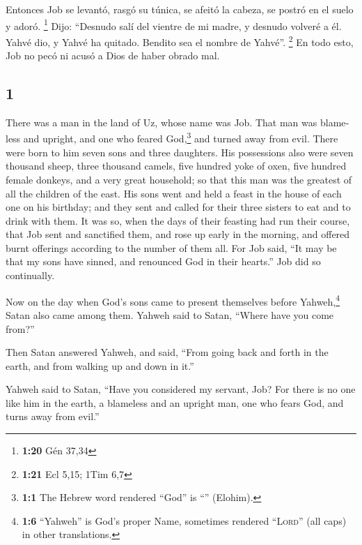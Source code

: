 \begin{paracol}{2}
 Entonces Job se levantó, rasgó su túnica, se afeitó la
cabeza, se postró en el suelo y adoró. \footnote{\textbf{1:20} Gén 37,34}
 Dijo: ``Desnudo salí del vientre de mi madre, y desnudo
volveré a él. Yahvé dio, y Yahvé ha quitado. Bendito sea el nombre de
Yahvé''. \footnote{\textbf{1:21} Ecl 5,15; 1Tim 6,7}  En
todo esto, Job no pecó ni acusó a Dios de haber obrado mal.

\switchcolumn
\begin{otherlanguage}{english}

\hypertarget{section-1}{%
\section{1}\label{section-1}}

 There was a man in the land of Uz, whose name was Job.
That man was blameless and upright, and one who feared God,\footnote{\textbf{1:1}
  The Hebrew word rendered ``God'' is ``'' (Elohim).} and
turned away from evil.  There were born to him seven sons
and three daughters.  His possessions also were seven
thousand sheep, three thousand camels, five hundred yoke of oxen, five
hundred female donkeys, and a very great household; so that this man was
the greatest of all the children of the east.  His sons
went and held a feast in the house of each one on his birthday; and they
sent and called for their three sisters to eat and to drink with them.
 It was so, when the days of their feasting had run their
course, that Job sent and sanctified them, and rose up early in the
morning, and offered burnt offerings according to the number of them
all. For Job said, ``It may be that my sons have sinned, and renounced
God in their hearts.'' Job did so continually.

 Now on the day when God's sons came to present themselves
before Yahweh,\footnote{\textbf{1:6} ``Yahweh'' is God's proper Name,
  sometimes rendered ``\textsc{Lord}'' (all caps) in other translations.}
Satan also came among them.  Yahweh said to Satan, ``Where
have you come from?''

Then Satan answered Yahweh, and said, ``From going back and forth in the
earth, and from walking up and down in it.''

 Yahweh said to Satan, ``Have you considered my servant,
Job? For there is no one like him in the earth, a blameless and an
upright man, one who fears God, and turns away from evil.''


\end{otherlanguage}
\end{paracol}
